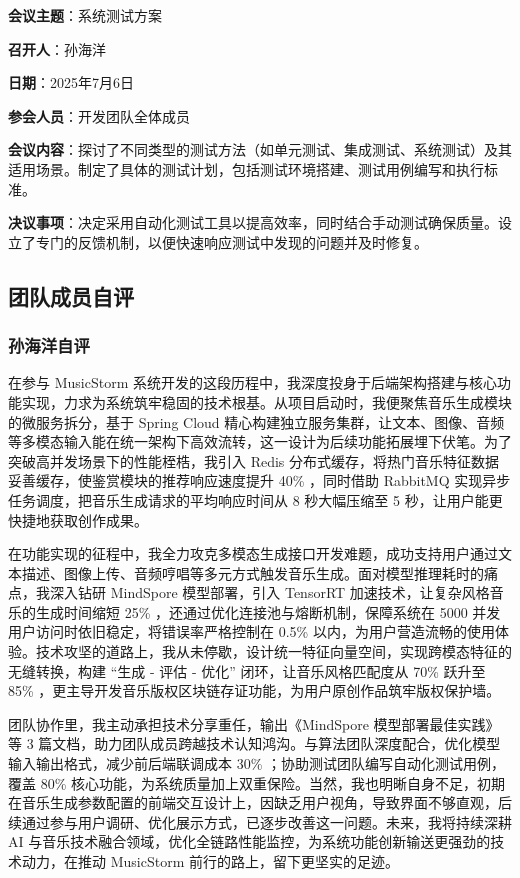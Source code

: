 \documentclass{base}
\numberwithin{figure}{section} %
\begin{document}
\textbf{会议主题}：系统测试方案

\textbf{召开人}：孙海洋

\textbf{日期}：2025年7月6日

\textbf{参会人员}：开发团队全体成员

\textbf{会议内容}：探讨了不同类型的测试方法（如单元测试、集成测试、系统测试）及其适用场景。制定了具体的测试计划，包括测试环境搭建、测试用例编写和执行标准。

\textbf{决议事项}：决定采用自动化测试工具以提高效率，同时结合手动测试确保质量。设立了专门的反馈机制，以便快速响应测试中发现的问题并及时修复。

\newpage
\subsection{团队成员自评}

\subsubsection{孙海洋自评}

在参与 MusicStorm 系统开发的这段历程中，我深度投身于后端架构搭建与核心功能实现，力求为系统筑牢稳固的技术根基。从项目启动时，我便聚焦音乐生成模块的微服务拆分，基于 Spring Cloud 精心构建独立服务集群，让文本、图像、音频等多模态输入能在统一架构下高效流转，这一设计为后续功能拓展埋下伏笔。为了突破高并发场景下的性能桎梏，我引入 Redis 分布式缓存，将热门音乐特征数据妥善缓存，使鉴赏模块的推荐响应速度提升 40\% ，同时借助 RabbitMQ 实现异步任务调度，把音乐生成请求的平均响应时间从 8 秒大幅压缩至 5 秒，让用户能更快捷地获取创作成果。

在功能实现的征程中，我全力攻克多模态生成接口开发难题，成功支持用户通过文本描述、图像上传、音频哼唱等多元方式触发音乐生成。面对模型推理耗时的痛点，我深入钻研 MindSpore 模型部署，引入 TensorRT 加速技术，让复杂风格音乐的生成时间缩短 25\% ，还通过优化连接池与熔断机制，保障系统在 5000 并发用户访问时依旧稳定，将错误率严格控制在 0.5\% 以内，为用户营造流畅的使用体验。技术攻坚的道路上，我从未停歇，设计统一特征向量空间，实现跨模态特征的无缝转换，构建 “生成 - 评估 - 优化” 闭环，让音乐风格匹配度从 70\% 跃升至 85\% ，更主导开发音乐版权区块链存证功能，为用户原创作品筑牢版权保护墙。

团队协作里，我主动承担技术分享重任，输出《MindSpore 模型部署最佳实践》等 3 篇文档，助力团队成员跨越技术认知鸿沟。与算法团队深度配合，优化模型输入输出格式，减少前后端联调成本 30\% ；协助测试团队编写自动化测试用例，覆盖 80\% 核心功能，为系统质量加上双重保险。当然，我也明晰自身不足，初期在音乐生成参数配置的前端交互设计上，因缺乏用户视角，导致界面不够直观，后续通过参与用户调研、优化展示方式，已逐步改善这一问题。未来，我将持续深耕 AI 与音乐技术融合领域，优化全链路性能监控，为系统功能创新输送更强劲的技术动力，在推动 MusicStorm 前行的路上，留下更坚实的足迹。
\end{document}
